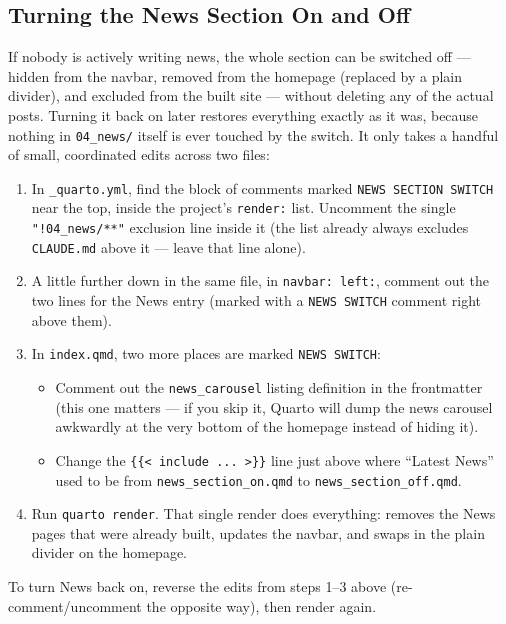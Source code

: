 \documentclass[11pt]{article}
\newcommand{\file}[1]{\texttt{#1}}
\newcommand{\cmd}[1]{\texttt{#1}}
\begin{document}
\subsection{Turning the News Section On and Off}
\label{sec:news-switch}

If nobody is actively writing news, the whole section can be switched
off --- hidden from the navbar, removed from the homepage (replaced by
a plain divider), and excluded from the built site --- without deleting
any of the actual posts. Turning it back on later restores everything
exactly as it was, because nothing in \file{04\_news/} itself is ever
touched by the switch. It only takes a handful of small, coordinated
edits across two files:

\begin{enumerate}
    \item In \file{\_quarto.yml}, find the block of comments marked
    \cmd{NEWS SECTION SWITCH} near the top, inside the project's
    \file{render:} list. Uncomment the single \cmd{"!04\_news/**"}
    exclusion line inside it (the list already always excludes
    \file{CLAUDE.md} above it --- leave that line alone).
    \item A little further down in the same file, in
    \file{navbar: left:}, comment out the two lines for the News entry
    (marked with a \cmd{NEWS SWITCH} comment right above them).
    \item In \file{index.qmd}, two more places are marked
    \cmd{NEWS SWITCH}:
    \begin{itemize}
        \item Comment out the \file{news\_carousel} listing definition
        in the frontmatter (this one matters --- if you skip it, Quarto
        will dump the news carousel awkwardly at the very bottom of the
        homepage instead of hiding it).
        \item Change the \cmd{\{\{< include ... >\}\}} line just above
        where ``Latest News'' used to be from
        \file{news\_section\_on.qmd} to \file{news\_section\_off.qmd}.
    \end{itemize}
    \item Run \cmd{quarto render}. That single render does everything:
    removes the News pages that were already built, updates the
    navbar, and swaps in the plain divider on the homepage.
\end{enumerate}

To turn News back on, reverse the edits from steps 1--3 above
(re-comment/uncomment the opposite way), then render again.
\end{document}
